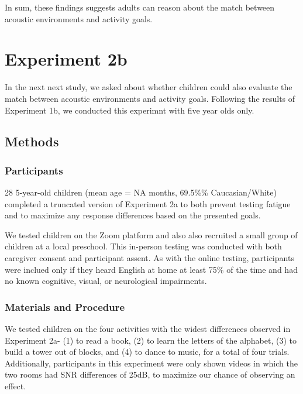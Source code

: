 \documentclass[10pt, letterpaper]{article}
\begin{document}
In sum, these findings suggests adults can reason about the match
between acoustic environments and activity goals.

\hypertarget{experiment-2b}{%
\section{Experiment 2b}\label{experiment-2b}}

In the next next study, we asked about whether children could also
evaluate the match between acoustic environments and activity goals.
Following the results of Experiment 1b, we conducted this experimnt with
five year olds only.

\hypertarget{methods-3}{%
\subsection{Methods}\label{methods-3}}

\hypertarget{participants-3}{%
\subsubsection{Participants}\label{participants-3}}

28 5-year-old children (mean age = NA months, 69.5\%\% Caucasian/White)
completed a truncated version of Experiment 2a to both prevent testing
fatigue and to maximize any response differences based on the presented
goals.

We tested children on the Zoom platform and also also recruited a small
group of children at a local preschool. This in-person testing was
conducted with both caregiver consent and participant assent. As with
the online testing, participants were inclued only if they heard English
at home at least 75\% of the time and had no known cognitive, visual, or
neurological impairments.

\hypertarget{materials-and-procedure-3}{%
\subsubsection{Materials and
Procedure}\label{materials-and-procedure-3}}

We tested children on the four activities with the widest differences
observed in Experiment 2a- (1) to read a book, (2) to learn the letters
of the alphabet, (3) to build a tower out of blocks, and (4) to dance to
music, for a total of four trials. Additionally, participants in this
experiment were only shown videos in which the two rooms had SNR
differences of 25dB, to maximize our chance of observing an effect.
\end{document}
